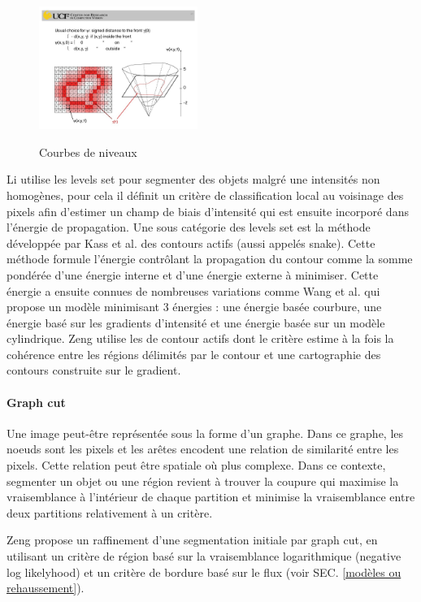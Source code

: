 \begin{figure}
  \centering
  \includegraphics[height=4cm]{Images/level_set_active_contour.jpeg}
  \label{fig:Courbes de niveaux}
  \caption{Courbes de niveaux}
\end{figure}

Li \cite{Li2011_mri_level_set} utilise les levels set pour segmenter des objets malgré une intensités non homogènes, pour cela il définit un critère de classification local au voisinage des pixels afin d'estimer un champ de biais d'intensité qui est ensuite incorporé dans l'énergie de propagation. Une sous catégorie des levels set est la méthode développée par Kass et al. \cite{Kass1988_snakes} des contours actifs (aussi appelés snake). Cette méthode formule l'énergie contrôlant la propagation du contour comme la somme pondérée d'une énergie interne et d'une énergie externe à minimiser. Cette énergie a ensuite connues de nombreuses variations comme Wang et al. \cite{Wang2012_vessel_level_set} qui propose un modèle minimisant 3 énergies : une énergie basée courbure, une énergie basé sur les gradients d'intensité et une énergie basée sur un modèle cylindrique. Zeng \cite{Zeng2018_liver_hybrid_active_contour_region_growing} utilise les de contour actifs dont le critère estime à la fois la cohérence entre les régions délimités par le contour et une cartographie des contours construite sur le gradient.

\paragraph{Graph cut}

Une image peut-être représentée sous la forme d'un graphe. Dans ce graphe, les noeuds sont les pixels et les arêtes encodent une relation de similarité entre les pixels. Cette relation peut être spatiale où plus complexe. Dans ce contexte, segmenter un objet ou une région revient à trouver la coupure qui maximise la vraisemblance à l'intérieur de chaque partition et minimise la vraisemblance entre deux partitions relativement à un critère.

Zeng \cite{Zeng2017_liver_oof_graph_cut} propose un raffinement d'une segmentation initiale par graph cut, en utilisant un critère de région basé sur la vraisemblance logarithmique (negative log likelyhood) et un critère de bordure basé sur le flux (voir SEC. \ref{modèles ou rehaussement}).


